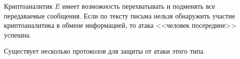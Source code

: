 Криптоаналитик $E$ имеет возможность перехватывать и подменять все передаваемые сообщения. Если по тексту письма нельзя обнаружить участие криптоаналитика в обмене информацией, то атака <<человек посередине>> успешна.

Существует несколько протоколов для защиты от атаки этого типа.
